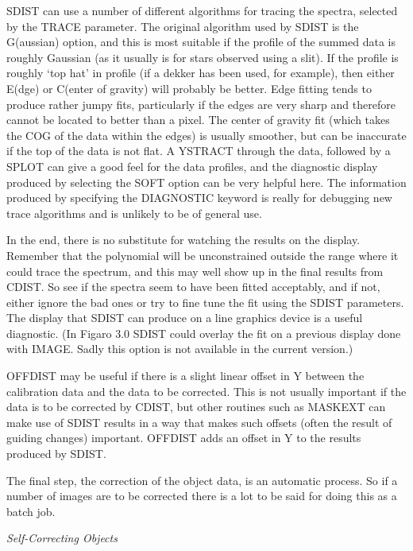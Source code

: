 SDIST can use a number of different 
algorithms for tracing the spectra, selected by the TRACE parameter.  The
original algorithm used by SDIST is the G(aussian) option, and this is
most suitable if the profile of the summed data is roughly Gaussian (as it
usually is for stars observed using a slit).  If the profile is roughly
`top hat' in profile (if a dekker has been used, for example), then either 
E(dge) or C(enter of gravity) will probably be better.  Edge fitting tends 
to produce rather jumpy fits, particularly if the edges are very sharp and
therefore cannot be located to better than a pixel.  The center of gravity
fit (which takes the COG of the data within the edges) is usually smoother,
but can be inaccurate if the top of the data is not flat.  A YSTRACT through
the data, followed by a SPLOT can give a good feel for the data profiles,
and the diagnostic display produced by selecting the SOFT option can be
very helpful here.  The information produced by specifying the DIAGNOSTIC
keyword is really for debugging new trace algorithms and is unlikely to be
of general use.

In the end, there is no substitute for watching the results on the
display.
Remember that the polynomial
will be unconstrained outside the range where it could trace the spectrum,
and this may well show up in the
final results from CDIST.  So see if the spectra seem to have been fitted
acceptably, and if not, either ignore the bad ones or try to fine tune the
fit using the SDIST parameters.  The display that SDIST can produce on a 
line graphics device is a useful diagnostic.
(In Figaro 3.0 SDIST could overlay the fit on a previous display done with
IMAGE. Sadly this option is not available in the current version.)

OFFDIST may be useful if there is a slight
linear offset in Y between the calibration data and the data to be
corrected.  This is not usually important if the data is to be corrected
by CDIST, but other routines such as MASKEXT can make use of SDIST results
in a way that makes such offsets (often the result of guiding changes)
important.  OFFDIST adds an offset in Y to the results produced by SDIST.

The final step, the correction of the object data, is an automatic
process.  So if a number of images are to be corrected there is a lot to be
said for doing this as a batch job.


\goodbreak
\vspace{12pt}
{\it Self-Correcting Objects}

